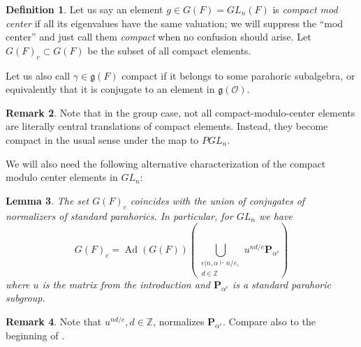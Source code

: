 \documentclass{amsart}
\numberwithin{equation}{section}
\newtheorem{lemma}{Lemma}[section]
\theoremstyle{definition}
\newtheorem{remark}[lemma]{Remark}%
\newtheorem{definition}[lemma]{Definition}%
\def\16{{\bf 16}}
\def\1{{\bf 1}}
\DeclareMathOperator{\Ad}{Ad}
\newcommand{\cO}{\mathcal{O}}
\newcommand{\fg}{\mathfrak{g}}
\newcommand{\bP}{\mathbf{P}}
\newcommand{\Z}{{\mathbb Z}}
\begin{document}
\begin{definition}
\label{def:compactelts}
Let us say an element $g\in G(F)=GL_n(F)$ is {\em compact mod center} if all its eigenvalues have the same valuation; we will suppress the ``mod center'' and just call them {\em compact} when no confusion should arise. Let $G(F)_c\subset G(F)$ be the subset of all compact elements. 

Let us also call $\gamma\in \fg(F)$ compact if it belongs to some parahoric subalgebra, or equivalently that it is conjugate to an element in $\fg(\cO)$.
\end{definition}
\begin{remark}
    Note that in the group case, not all compact-modulo-center elements are literally central translations of compact elements. Instead, they become compact in the usual sense under the map to $PGL_n$.
\end{remark}
We will also need the following alternative characterization of the compact modulo center elements in $GL_n$:
\begin{lemma}
\label{lem:compactelts}
The set $G(F)_c$ coincides with the union of conjugates of normalizers of standard parahorics. In particular, for $GL_n$ we have 
$$G(F)_c=\Ad(G(F))\left(\bigcup_{\substack{e|n,\alpha\vdash n/e,\\ d\in \Z}} u^{nd/e} \bP_{\alpha^e} \right)$$ where $u$ is the matrix from the introduction and $\bP_{\alpha^e}$ is a standard parahoric subgroup. 
\end{lemma}
\begin{remark}
    Note that $u^{nd/e}, d\in \Z$, normalizes $\bP_{\alpha^e}$. Compare also to the beginning of \cite[Section 4]{W2}.
\end{remark}
\end{document}
